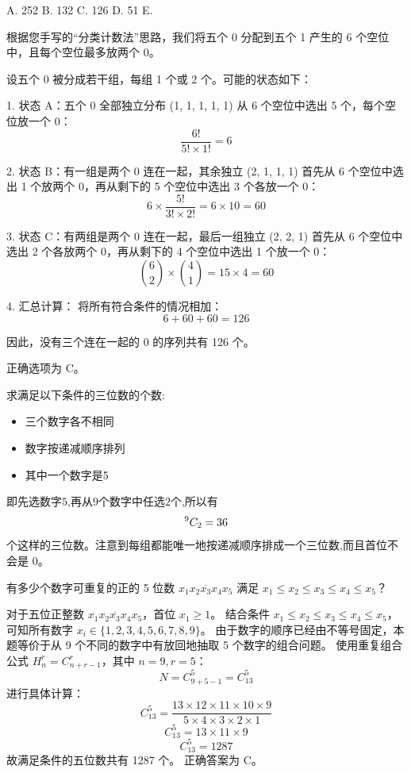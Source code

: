 \begin{questions}
A. 252 \quad B. 132 \quad C. 126 \quad D. 51 \quad E. 

\begin{solution}
根据您手写的“分类计数法”思路，我们将五个 0 分配到五个 1 产生的 6 个空位中，且每个空位最多放两个 0。

设五个 0 被分成若干组，每组 1 个或 2 个。可能的状态如下：

1. 状态 A：五个 0 全部独立分布 (1, 1, 1, 1, 1)
   从 6 个空位中选出 5 个，每个空位放一个 0：
   \[ \frac{6!}{5! \times 1!} = 6 \]

2. 状态 B：有一组是两个 0 连在一起，其余独立 (2, 1, 1, 1)
   首先从 6 个空位中选出 1 个放两个 0，再从剩下的 5 个空位中选出 3 个各放一个 0：
   \[ 6 \times \frac{5!}{3! \times 2!} = 6 \times 10 = 60 \]

3. 状态 C：有两组是两个 0 连在一起，最后一组独立 (2, 2, 1)
   首先从 6 个空位中选出 2 个各放两个 0，再从剩下的 4 个空位中选出 1 个放一个 0：
   \[ \binom{6}{2} \times \binom{4}{1} = 15 \times 4 = 60 \]

4. 汇总计算：
   将所有符合条件的情况相加：
   \[ 6 + 60 + 60 = 126 \]

因此，没有三个连在一起的 0 的序列共有 126 个。

正确选项为 C。
\end{solution}
    \question 求满足以下条件的三位数的个数:  
    \begin{itemize}
        \item 三个数字各不相同
        \item 数字按递减顺序排列
        \item 其中一个数字是5
    \end{itemize}  
    \begin{solution}
        即先选数字$5$,再从$9$个数字中任选$2$个,所以有 
        \[
        {}^{9}C_{2}=36
        \]
        个这样的三位数。注意到每组都能唯一地按递减顺序排成一个三位数,而且首位不会是 $0$。
    \end{solution}

    \question
有多少个数字可重复的正的 5 位数 $\overline{x_1x_2x_3x_4x_5}$ 满足 $x_1 \le x_2 \le x_3 \le x_4 \le x_5$？

\begin{solution}
对于五位正整数 $\overline{x_1x_2x_3x_4x_5}$，首位 $x_1 \ge 1$。
结合条件 $x_1 \le x_2 \le x_3 \le x_4 \le x_5$，可知所有数字 $x_i \in \{1, 2, 3, 4, 5, 6, 7, 8, 9\}$。
由于数字的顺序已经由不等号固定，本题等价于从 9 个不同的数字中有放回地抽取 5 个数字的组合问题。
使用重复组合公式 $H_n^r = C_{n+r-1}^r$，其中 $n = 9, r = 5$：
\[ N = C_{9+5-1}^5 = C_{13}^5 \]
进行具体计算：
\[ C_{13}^5 = \frac{13 \times 12 \times 11 \times 10 \times 9}{5 \times 4 \times 3 \times 2 \times 1} \]
\[ C_{13}^5 = 13 \times 11 \times 9 \]
\[ C_{13}^5 = 1287 \]
故满足条件的五位数共有 1287 个。
正确答案为 C。
\end{solution}


\end{questions}
